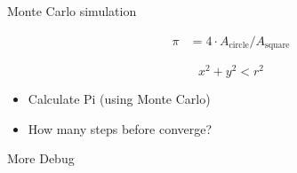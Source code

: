 \documentclass{beamer}
\begin{document}
\begin{frame}[fragile]


    Monte Carlo simulation

    \begin{align*}
        \pi &= 4 \cdot A_\text{circle} / A_\text{square}
    \end{align*}

    \begin{equation*}
        x^2 + y^2 < r^2
    \end{equation*}

    \begin{itemize}
        \item Calculate Pi (using Monte Carlo)
        \item How many steps before converge?
    \end{itemize}

\end{frame}


\begin{frame}[fragile]

    More Debug


\end{frame}


\end{document}

